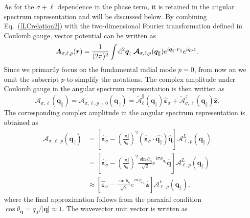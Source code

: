 %
%
%
%
As for the $\sigma+\ell$ dependence in the phase term, it is retained in the angular spectrum representation and will be discussed below. By combining Eq.~(\ref{LCrelation2}) with the two-dimensional Fourier transformation defined in Coulomb gauge, vector potential can be written as
\begin{equation}
\boldsymbol{A}_{\sigma, \ell, p}(\boldsymbol{r})
=
\frac{1}{(2\pi)^2}
\int {\rm d}^2 \boldsymbol{q}_\parallel
\,
\boldsymbol{\mathcal{A}}_{\sigma, \ell, p}(\boldsymbol{q_\parallel})
e^{i\boldsymbol{q_\parallel}\cdot \boldsymbol{r}_\parallel}
e^{iq_0 z}.
\label{planwaveinC}
\end{equation}
Since we primarily focus on the fundamental radial mode $p=0$, from now on we omit the subscript $p$ to simplify the notations. The complex amplitude under Coulomb gauge in the angular spectrum representation is then written as
\begin{equation}
\boldsymbol{\mathcal{A}}_{\sigma, \ell}(\boldsymbol{q}_\parallel)
=\boldsymbol{\mathcal{A}}_{\sigma, \ell, p=0}(\boldsymbol{q}_\parallel)
=\tilde{\mathcal{A}}^{\parallel}_{\ell}(\boldsymbol{q}_\parallel) \hat{\boldsymbol{\varepsilon}}_\sigma + \tilde{\mathcal{A}}^{z}_{\sigma, \ell}(\boldsymbol{q}_\parallel) \hat{\boldsymbol{z}}.
\label{AinCinQ}
\end{equation}
The corresponding complex amplitude in the angular spectrum representation is obtained as
\begin{align}
\boldsymbol{\mathcal{A}}_{\sigma, \ell, p}(\boldsymbol{q_\parallel})
&=
\left[
\hat{\boldsymbol{\varepsilon}}_\sigma
-
\left(
\frac{|\boldsymbol{q}|}{q_0}
\right)^2
(\hat{\boldsymbol{\varepsilon}}_\sigma\cdot\hat{\boldsymbol{q}_\parallel})
\hat{\boldsymbol{q}}
\right]
\mathcal{A}^L_{\ell, p}(\boldsymbol{q_\parallel}) \\
&=
\left[
\hat{\boldsymbol{\varepsilon}}_\sigma
-
\left(
\frac{|\boldsymbol{q}|}{q_0}
\right)^2
\frac{\sin\theta_{\boldsymbol{q}}}{\sqrt{2}}
e^{i\sigma\phi_{\boldsymbol{q}_\parallel}}
\hat{\boldsymbol{q}}
\right]
\mathcal{A}^L_{\ell, p}(\boldsymbol{q_\parallel}) \label{sigma_limit} \\
&\approx
\left[
\hat{\boldsymbol{\varepsilon}}_\sigma
-
\frac{\sin\theta_{\boldsymbol{q}}}{\sqrt{2}}
e^{i\sigma\phi_{\boldsymbol{q}_\parallel}}
\hat{\boldsymbol{z}}
\right]
\mathcal{A}^L_{\ell, p}(\boldsymbol{q_\parallel}),
\label{approx_to_1}
\end{align}
where the final approximation follows from the paraxial condition $\cos\theta_{\boldsymbol{q}} = q_0/|\boldsymbol{q}| \approx 1$. The wavevector unit vector is written as
